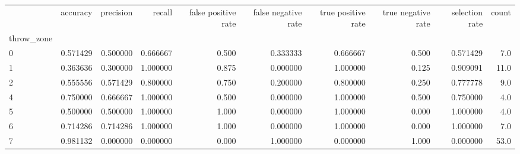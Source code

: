 \begin{tabular}{lrrrrrrrrr}
\toprule
{} &  accuracy &  precision &    recall &  false positive rate &  false negative rate &  true positive rate &  true negative rate &  selection rate &  count \\
throw\_zone &           &            &           &                      &                      &                     &                     &                 &        \\
\midrule
0          &  0.571429 &   0.500000 &  0.666667 &                0.500 &             0.333333 &            0.666667 &               0.500 &        0.571429 &    7.0 \\
1          &  0.363636 &   0.300000 &  1.000000 &                0.875 &             0.000000 &            1.000000 &               0.125 &        0.909091 &   11.0 \\
2          &  0.555556 &   0.571429 &  0.800000 &                0.750 &             0.200000 &            0.800000 &               0.250 &        0.777778 &    9.0 \\
4          &  0.750000 &   0.666667 &  1.000000 &                0.500 &             0.000000 &            1.000000 &               0.500 &        0.750000 &    4.0 \\
5          &  0.500000 &   0.500000 &  1.000000 &                1.000 &             0.000000 &            1.000000 &               0.000 &        1.000000 &    4.0 \\
6          &  0.714286 &   0.714286 &  1.000000 &                1.000 &             0.000000 &            1.000000 &               0.000 &        1.000000 &    7.0 \\
7          &  0.981132 &   0.000000 &  0.000000 &                0.000 &             1.000000 &            0.000000 &               1.000 &        0.000000 &   53.0 \\
\bottomrule
\end{tabular}
